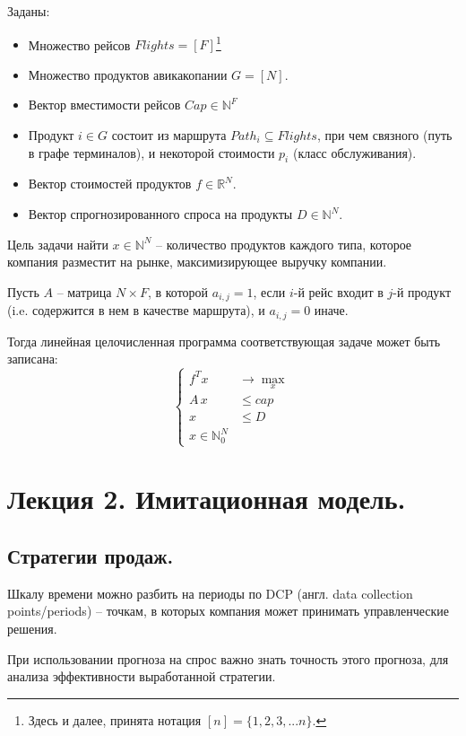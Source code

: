 \documentclass[reqno]{article}
\theoremstyle{definition}
\theoremstyle{definition}
\theoremstyle{definition}
\theoremstyle{definition}
\theoremstyle{definition}
\theoremstyle{definition}
\theoremstyle{definition}
\theoremstyle{definition}
\theoremstyle{definition}
\begin{document}
		Заданы:
		\begin{itemize}
			\item Множество рейсов $Flights = [F]$\footnote{Здесь и далее, принята нотация $[n] = \{1, 2, 3, ... n\}$.}
			\item Множество продуктов авикакопании $G = [N]$.
			\item Вектор вместимости рейсов $Cap \in \mathds{N}^F$
			\item Продукт $i \in G$ состоит из маршрута $Path_i \subseteq Flights$, при чем связного (путь в графе терминалов), и некоторой стоимости $p_i$ (класс обслуживания).
			\item Вектор стоимостей продуктов $f \in \mathds{R}^N$.
			\item Вектор спрогнозированного спроса на продукты $D \in \mathds{N}^N$.
		
		\end{itemize}
	
		Цель задачи найти $x \in \mathds{N}^N$ -- количество продуктов каждого типа, которое компания разместит на рынке, максимизирующее выручку компании.
		
		Пусть $A$ -- матрица $N\times F$, в которой $a_{i, j} = 1$, если $i$-й рейс входит в $j$-й продукт (i.e. содержится в нем в качестве маршрута), и $a_{i, j} = 0$ иначе.
		
		Тогда линейная целочисленная программа соответствующая задаче может быть записана:
		$$
		\begin{cases}
			f^T x &\rightarrow \max_x\\
			A\,x  &\leq cap\\
			x     &\leq D\\
			x \in \mathds{N}_0^N &
		\end{cases}
		$$
	
	
	
	\newpage
	\section{Лекция 2. Имитационная модель.}
		\subsection{Стратегии продаж.}
		
		Шкалу времени можно разбить на периоды по DCP (англ. data collection points/periods) -- точкам, в которых компания может принимать управленческие решения.
		
		При использовании прогноза на спрос важно знать точность этого прогноза, для анализа эффективности выработанной стратегии.
		
\end{document}
